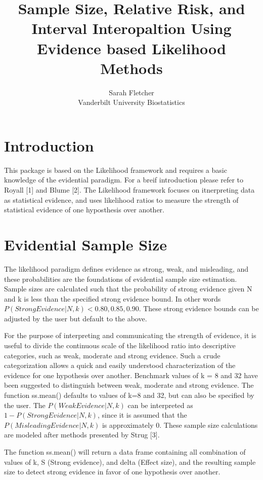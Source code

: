 \documentclass{article}
\title{Sample Size, Relative Risk, and Interval Interopaltion Using Evidence based Likelihood Methods}
\author{Sarah Fletcher\\ Vanderbilt University Biostatistics}
\begin{document}
\maketitle
\tableofcontents
\section{Introduction}

This package is based on the Likelihood framework and requires  a basic knowledge of the evidential paradigm.  For a breif introduction please refer to Royall [1] and  Blume [2].  The Likelihood framework focuses on itnerpreting data as statistical evidence, and uses likelihood ratios to measure the strength of statistical evidence of one hyposthesis over another.  

\section{Evidential Sample Size}

The likelihood paradigm defines evidence as strong, weak, and misleading, and these probabilities are the foundations of evidential sample size estimation.   Sample sizes are calculated such that the probability of strong evidence given N and k is less than the specified strong evidence bound. In other words $P(Strong Evidence | N, k) <0.80, 0.85, 0.90$.  These strong evidence bounds can be adjusted by the user but default to the above. 

 For the purpose of interpreting and communicating the strength of evidence, it is useful to divide the continuous scale of the likelihood ratio into descriptive categories, such as weak, moderate and strong evidence. 
Such a crude categorization allows a quick and easily understood characterization of the evidence for one hypothesis over another.
 Benchmark values of k = 8 and 32 have been suggested to distinguish between weak, moderate and strong evidence.  The function ss.mean() defaults to values of k=8 and 32, but can also be specified by the user.  The $P(Weak Evidence | N, k)$ can be interpreted as $1-P(Strong Evidence | N, k)$, since it is assumed that the $P(Misleading Evidence | N, k)$ is approximately 0.  These sample size calculations are modeled after methods presented by Strug [3].
 
The function ss.mean() will return a data frame containing all combination of values of k, S (Strong evidence), and delta (Effect size), and the resulting sample size to detect strong evidence in favor of one hypothesis over another.  
\end{document}
